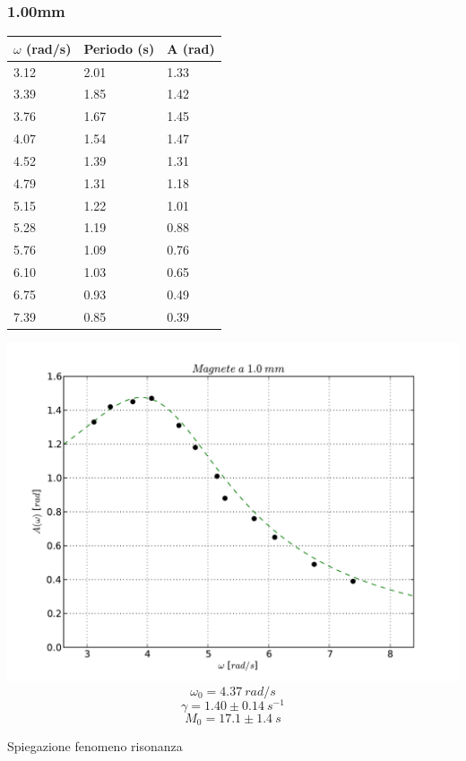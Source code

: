 \documentclass[a4paper,10pt]{report}
\begin{document}
\subsubsection{1.00mm}
\begin{center}
\begin{tabular}{l|l|l}
$\omega$ (rad/s) & Periodo (s) & A (rad) \\
\midrule
3.12 & 2.01 & 1.33 \\
3.39 & 1.85 & 1.42 \\
3.76 & 1.67 & 1.45 \\
4.07 & 1.54 & 1.47 \\
4.52 & 1.39 & 1.31 \\
4.79 & 1.31 & 1.18 \\
5.15 & 1.22 & 1.01 \\
5.28 & 1.19 & 0.88 \\
5.76 & 1.09 & 0.76 \\
6.10 & 1.03 & 0.65 \\
6.75 & 0.93 & 0.49 \\
7.39 & 0.85 & 0.39 \\
\midrule
\end{tabular}
\end{center}
\includegraphics[scale=0.75]{"../grafici/Magnetea10mm"}
\\

$$ \omega_0 = 4.37\ rad/s $$
$$ \gamma = 1.40 \pm 0.14\ s^{-1}$$
$$ M_0 = 17.1 \pm 1.4\ s$$

Spiegazione fenomeno risonanza

\end{document}
